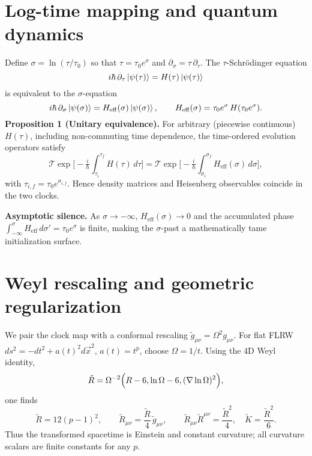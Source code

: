 \documentclass[aps,prd,onecolumn,superscriptaddress,nofootinbib]{revtex4-2}
\begin{document}
\section{Log-time mapping and quantum dynamics}\label{sec:logtime}
Define $\sigma=\ln(\tau/\tau_0)$ so that $\tau=\tau_0 e^{\sigma}$ and $\partial_\sigma = \tau\,\partial_\tau$. The $\tau$-Schr\"odinger equation
\begin{equation}
i\hbar\,\partial_\tau \ket{\psi(\tau)}=H(\tau)\ket{\psi(\tau)}
\end{equation}
is equivalent to the $\sigma$-equation
\begin{equation}
i\hbar\,\partial_\sigma \ket{\psi(\sigma)} = H_{\mathrm{eff}}(\sigma)\ket{\psi(\sigma)},\qquad
H_{\mathrm{eff}}(\sigma)=\tau_0 e^\sigma\, H(\tau_0 e^\sigma).
\end{equation}
\textbf{Proposition 1 (Unitary equivalence).} For arbitrary (piecewise continuous) $H(\tau)$, including non-commuting time dependence, the time-ordered evolution operators satisfy
\begin{equation}
\mathcal{T}\exp\!\Big[-\tfrac{i}{\hbar}\!\int_{\tau_i}^{\tau_f} \!H(\tau)\,d\tau\Big]
=\mathcal{T}\exp\!\Big[-\tfrac{i}{\hbar}\!\int_{\sigma_i}^{\sigma_f} \!H_{\mathrm{eff}}(\sigma)\,d\sigma\Big],
\end{equation}
with $\tau_{i,f}=\tau_0 e^{\sigma_{i,f}}$. Hence density matrices and Heisenberg observables coincide in the two clocks.

\textbf{Asymptotic silence.} As $\sigma\to-\infty$, $H_{\mathrm{eff}}(\sigma)\to 0$ and the accumulated phase $\int_{-\infty}^{\sigma} H_{\mathrm{eff}}\, d\sigma'=\tau_0 e^{\sigma}$ is finite, making the $\sigma$-past a mathematically tame initialization surface.

\section{Weyl rescaling and geometric regularization}\label{sec:weyl}
We pair the clock map with a conformal rescaling $\tilde g_{\mu\nu}=\Omega^2 g_{\mu\nu}$. For flat FLRW $ds^2=-dt^2+a(t)^2 d\vec x^2$, $a(t)=t^p$, choose $\Omega=1/t$. Using the 4D Weyl identity,
\begin{equation}
\tilde R = \Omega^{-2}\Big(R-6\\, \ln\Omega - 6\\,(\nabla \ln\Omega)^2\Big),
\end{equation}
one finds
\begin{equation}
\tilde R = 12(p-1)^2,\qquad 
\tilde R_{\mu\nu}=\frac{\tilde R}{4}\,\tilde g_{\mu\nu},\qquad
\tilde R_{\mu\nu}\tilde R^{\mu\nu}=\frac{\tilde R^2}{4},\quad
\tilde K=\frac{\tilde R^2}{6}.
\end{equation}
Thus the transformed spacetime is Einstein and constant curvature; all curvature scalars are finite constants for any $p$.
\end{document}
